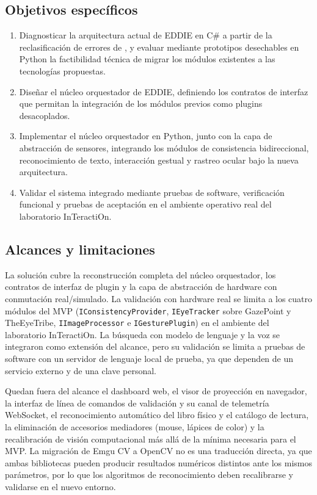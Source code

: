 \subsection{Objetivos específicos}

\begin{enumerate}
  \item Diagnosticar la arquitectura actual de EDDIE en C\# a partir de la reclasificación de errores de \citet{ibaceta2023}, y evaluar mediante prototipos desechables en Python la factibilidad técnica de migrar los módulos existentes a las tecnologías propuestas.
  \item Diseñar el núcleo orquestador de EDDIE, definiendo los contratos de interfaz que permitan la integración de los módulos previos como plugins desacoplados.
  \item Implementar el núcleo orquestador en Python, junto con la capa de abstracción de sensores, integrando los módulos de consistencia bidireccional, reconocimiento de texto, interacción gestual y rastreo ocular bajo la nueva arquitectura.
  \item Validar el sistema integrado mediante pruebas de software, verificación funcional y pruebas de aceptación en el ambiente operativo real del laboratorio InTeractiOn.
\end{enumerate}

\subsection{Alcances y limitaciones}

La solución cubre la reconstrucción completa del núcleo orquestador, los contratos de interfaz de plugin y la capa de abstracción de hardware con conmutación real/simulado. La validación con hardware real se limita a los cuatro módulos del MVP (\texttt{IConsistencyProvider}, \texttt{IEyeTracker} sobre GazePoint y TheEyeTribe, \texttt{IImageProcessor} e \texttt{IGesturePlugin}) en el ambiente del laboratorio InTeractiOn. La búsqueda con modelo de lenguaje y la voz se integraron como extensión del alcance, pero su validación se limita a pruebas de software con un servidor de lenguaje local de prueba, ya que dependen de un servicio externo y de una clave personal.

Quedan fuera del alcance el dashboard web, el visor de proyección en navegador, la interfaz de línea de comandos de validación y su canal de telemetría WebSocket, el reconocimiento automático del libro físico y el catálogo de lectura, la eliminación de accesorios mediadores (mouse, lápices de color) y la recalibración de visión computacional más allá de la mínima necesaria para el MVP. La migración de Emgu CV a OpenCV no es una traducción directa, ya que ambas bibliotecas pueden producir resultados numéricos distintos ante los mismos parámetros, por lo que los algoritmos de reconocimiento deben recalibrarse y validarse en el nuevo entorno.

